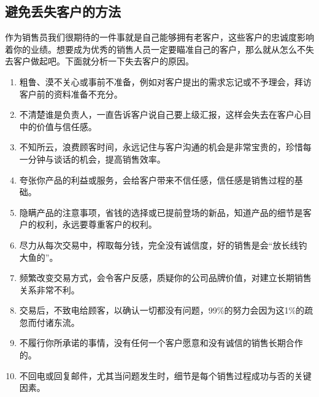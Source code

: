 \subsection {避免丢失客户的方法}

    作为销售员我们很期待的一件事就是自己能够拥有老客户，这些客户的忠诚度影响着你的业绩。想要成为优秀的销售人员一定要瞄准自己的客户，那么就从怎么不失去客户做起吧。下面就分析一下失去客户的原因。

    \begin{enumerate}
        \item 粗鲁、漠不关心或事前不准备，例如对客户提出的需求忘记或不予理会，拜访客户前的资料准备不充分。

        \item 不清楚谁是负责人，一直告诉客户说自己要上级汇报，这样会失去在客户心目中的价值与信任感。

        \item 不知所云，浪费顾客时间，永远记住与客户沟通的机会是非常宝贵的，珍惜每一分钟与谈话的机会，提高销售效率。

        \item 夸张你产品的利益或服务，会给客户带来不信任感，信任感是销售过程的基础。

        \item 隐瞒产品的注意事项，省钱的选择或已提前登场的新品，知道产品的细节是客户的权利，永远要尊重客户的权利。

        \item 尽力从每次交易中，榨取每分钱，完全没有诚信度，好的销售是会“放长线钓大鱼的”。

        \item 频繁改变交易方式，会令客户反感，质疑你的公司品牌价值，对建立长期销售关系非常不利。

        \item 交易后，不致电给顾客，以确认一切都没有问题，99\%的努力会因为这1\%的疏忽而付诸东流。

        \item 不履行你所承诺的事情，没有任何一个客户愿意和没有诚信的销售长期合作的。

        \item 不回电或回复邮件，尤其当问题发生时，细节是每个销售过程成功与否的关键因素。
    \end{enumerate}
